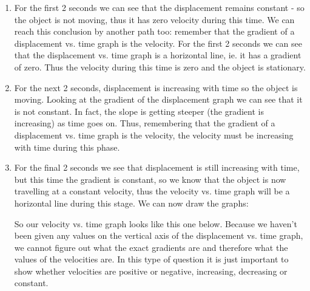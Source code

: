 {\begin{mdframed}[linewidth=4, leftmargin=40, rightmargin=40]
\begin{exercise}
\begin{enumerate}[noitemsep, label=\textbf{Step} \textbf{\arabic*}. ]
      \label{m38795*id73443}To answer these questions, break the motion up into three sections: 0 -- 2 seconds, 2 -- 4 seconds and 4 -- 6 seconds.\par 
      \item  
      \label{m38795*id73455}For the first 2 seconds we can see that the displacement remains constant - so the object is not moving, thus it has zero velocity during this time. We can reach this conclusion by another path too: remember that the gradient of a displacement vs. time graph is the velocity. For the first 2 seconds we can see that the displacement vs. time graph is a horizontal line, ie. it has a gradient of zero. Thus the velocity during this time is zero and the object is stationary.\par 
      \item  
      \label{m38795*id73469}For the next 2 seconds, displacement is increasing with time so the object is moving. Looking at the gradient of the displacement graph we can see that it is not constant. In fact, the slope is getting steeper (the gradient is increasing) as time goes on. Thus, remembering that the gradient of a displacement vs. time graph is the velocity, the velocity must be increasing with time during this phase.\par 
      \item  
      \label{m38795*id73483}For the final 2 seconds we see that displacement is still increasing with time, but this time the gradient is constant, so we know that the object is now travelling at a constant velocity, thus the velocity vs. time graph will be a horizontal line during this stage. We can now draw the graphs:\par 
      \label{m38795*id73489}So our velocity vs. time graph looks like this one below. Because we haven't been given any values on the vertical axis of the displacement vs. time graph, we cannot figure out what the exact gradients are and therefore what the values of the velocities are. In this type of question it is just important to show whether velocities are positive or negative, increasing, decreasing or constant.\par 
      \label{m38795*id73495}
        
    \setcounter{subfigure}{0}



\end{enumerate}
\end{exercise}
\end{mdframed}}
